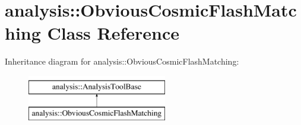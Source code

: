 \hypertarget{classanalysis_1_1ObviousCosmicFlashMatching}{\section{analysis\-:\-:Obvious\-Cosmic\-Flash\-Matching Class Reference}
\label{classanalysis_1_1ObviousCosmicFlashMatching}
}
Inheritance diagram for analysis\-:\-:Obvious\-Cosmic\-Flash\-Matching\-:\begin{figure}[H]
\begin{center}
\leavevmode
\includegraphics[height=2.000000cm]{classanalysis_1_1ObviousCosmicFlashMatching}
\end{center}
\end{figure}
